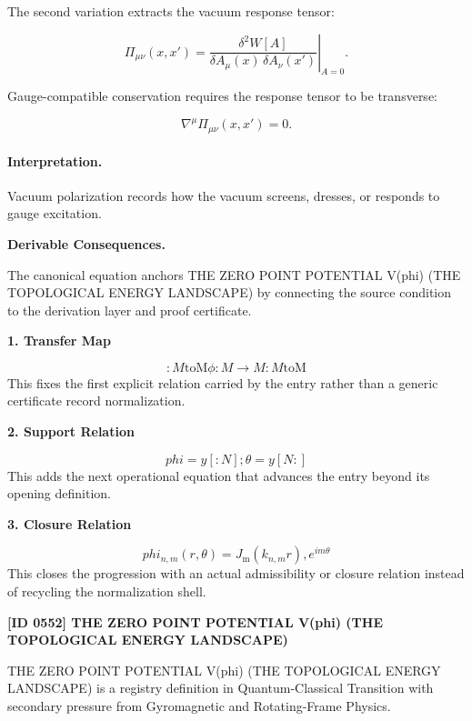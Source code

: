 The second variation extracts the vacuum response tensor:

\begin{equation}
\Pi_{\mu\nu}(x,x')
=
\left.
\frac{\delta^2 W[A]}
{\delta A_\mu(x)\,\delta A_\nu(x')}
\right|_{A=0}.
\end{equation}

Gauge-compatible conservation requires the response tensor to be transverse:

\begin{equation}
\nabla^\mu \Pi_{\mu\nu}(x,x')=0 .
\end{equation}

\paragraph{Interpretation.}
Vacuum polarization records how the vacuum screens, dresses, or responds to gauge excitation.

\par\vspace{0.35em}
\noindent\textbf{Derivable Consequences.}\quad
\begingroup
\footnotesize
\raggedright
The canonical equation anchors THE ZERO POINT POTENTIAL V(phi) (THE TOPOLOGICAL ENERGY LANDSCAPE) by connecting the source condition to the derivation layer and proof certificate.
\par\endgroup

\noindent\textbf{1. Transfer Map}\par
\[
:M\mathrm{toM}\phi:M\to M:M\mathrm{toM}
\]
\noindent This fixes the first explicit relation carried by the entry rather than a generic certificate record normalization.\par
\noindent\textbf{2. Support Relation}\par
\[
phi = y[:N]; \theta = y[N:]
\]
\noindent This adds the next operational equation that advances the entry beyond its opening definition.\par
\noindent\textbf{3. Closure Relation}\par
\[
phi_{n,m}(r,\theta) = J_{\mathrm{m}}(k_{n,m} r), e^{i m \theta}
\]
\noindent This closes the progression with an actual admissibility or closure relation instead of recycling the normalization shell.\par

\clearpage
\noindent\textbf{[ID 0552] THE ZERO POINT POTENTIAL V(phi) (THE TOPOLOGICAL ENERGY LANDSCAPE)}\par
\vspace{0.35em}
\begingroup\small
{}
THE ZERO POINT POTENTIAL V(phi) (THE TOPOLOGICAL ENERGY LANDSCAPE) is a registry definition in Quantum-Classical Transition with secondary pressure from Gyromagnetic and Rotating-Frame Physics.

